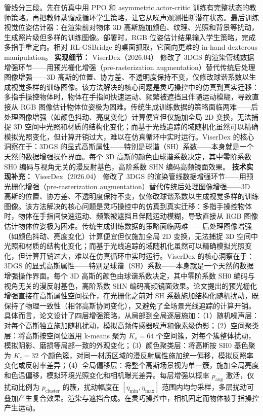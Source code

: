 管线分三段。先在仿真中用 PPO 和 asymmetric actor-critic 训练有完整状态的教师策略。再把教师蒸馏成循环学生策略，让它从噪声观测推断潜在状态。最后训练视觉位姿估计器：在渲染前对物体 3D 高斯施加颜色、纹理、光照和背景等扰动，生成照片级但多样的训练图像。部署时，RGB 位姿估计结果输入学生策略，完成多指手重定向。相对 RL-GSBridge 的桌面抓取，它面向更难的 in-hand dexterous manipulation。
\textbf{实现细节：} ViserDex（2026.04） 修改了 3DGS 的渲染管线数据增强环节——用预光栅化增强（pre-rasterization augmentation）替代传统后处理图像增强——3D 高斯的位置、协方差、不透明度保持不变，仅修改球谐系数以生成视觉多样的训练图像。该方法解决的核心问题是灵巧操控中的仿真到真实迁移：多指手操控物体时，物体在手指间快速运动、频繁被遮挡且伴随运动模糊，导致直接从 RGB 图像估计物体位姿极为困难。传统生成训练数据的策略面临两难——后处理图像增强（如颜色抖动、亮度变化）计算便宜但仅施加全局 2D 变换，无法捕捉 3D 空间中光照和材质的结构化变化；而基于光线追踪的域随机化虽然可以精确模拟光照变化，但计算开销过大，难以在仿真循环中实时运行。ViserDex 的核心洞察在于：3DGS 的显式高斯属性——特别是球谐（SH）系数——本身就是一个天然的数据增强操作界面。每个 3D 高斯的颜色由球谐系数决定，其中零阶系数 $\mathrm{SH0}$ 编码与视角无关的漫反射基色，高阶系数 $\mathrm{SHN}$ 编码高频镜面效果。
\textbf{技术实现补充：} ViserDex（2026.04） 修改了 3DGS 的渲染管线数据增强环节——用预光栅化增强（pre-rasterization augmentation）替代传统后处理图像增强——3D 高斯的位置、协方差、不透明度保持不变，仅修改球谐系数以生成视觉多样的训练图像。该方法解决的核心问题是灵巧操控中的仿真到真实迁移：多指手操控物体时，物体在手指间快速运动、频繁被遮挡且伴随运动模糊，导致直接从 RGB 图像估计物体位姿极为困难。传统生成训练数据的策略面临两难——后处理图像增强（如颜色抖动、亮度变化）计算便宜但仅施加全局 2D 变换，无法捕捉 3D 空间中光照和材质的结构化变化；而基于光线追踪的域随机化虽然可以精确模拟光照变化，但计算开销过大，难以在仿真循环中实时运行。ViserDex 的核心洞察在于：3DGS 的显式高斯属性——特别是球谐（SH）系数——本身就是一个天然的数据增强操作界面。每个 3D 高斯的颜色由球谐系数决定，其中零阶系数 $\mathrm{SH0}$ 编码与视角无关的漫反射基色，高阶系数 $\mathrm{SHN}$ 编码高频镜面效果。论文提出的预光栅化增强直接在高斯属性空间操作，在光栅化之前对 SH 系数施加结构化随机扰动，既保持了物理一致性（相邻高斯协同变化），又避免了全场景光线追踪的计算开销。具体而言，论文设计了四层增强策略，从局部到全局逐层施加：（1）随机噪声层：对每个高斯独立施加随机扰动，模拟高频传感器噪声和像素级伪影；（2）空间聚类层：将高斯按空间位置用 k-means 聚为 $K_s=64$ 个空间簇，对每个簇整体扰动，模拟阴影、磨损等局部一致的外观变化；（3）颜色聚类层：将高斯按 $\mathrm{SH0}$ 基色聚为 $K_c=32$ 个颜色簇，对同一材质区域的漫反射属性施加统一偏移，模拟反照率变化或反射率差异；（4）全局偏移层：将整个高斯场景视为单一簇，施加全局亮度和色温偏移，模拟环境光照变化和相机曝光差异。每层增强以概率 $p_\mathrm{aug}$ 激活，仅扰动比例为 $p_\mathrm{cluster}$ 的簇，扰动幅度在 $[\eta_\mathrm{min}, \eta_\mathrm{max}]$ 范围内均匀采样，多层扰动可叠加产生复合效果。渲染与遮挡合成。在灵巧操控中，相机固定而物体被手指操控产生运动。
